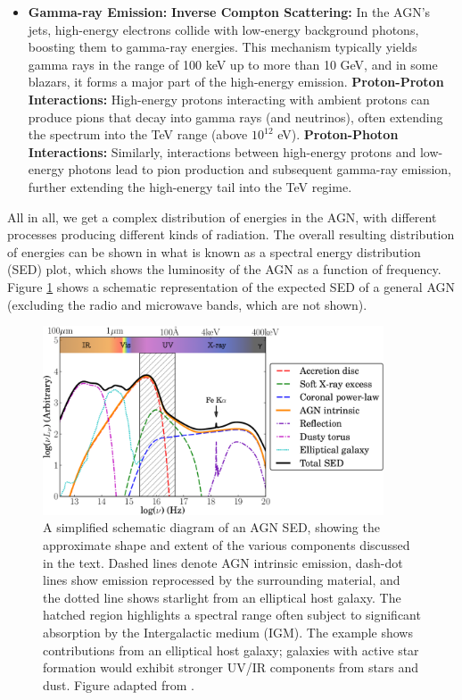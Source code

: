 \begin{itemize}
    \item \textbf{Gamma-ray Emission:}
    \subitem \textbf{Inverse Compton Scattering:} In the AGN's jets, high-energy electrons collide with low-energy background photons, boosting them to gamma-ray energies. This mechanism typically yields gamma rays in the range of 100 keV up to more than 10 GeV, and in some blazars, it forms a major part of the high-energy emission.
    \subitem \textbf{Proton-Proton Interactions:} High-energy protons interacting with ambient protons can produce pions that decay into gamma rays (and neutrinos), often extending the spectrum into the TeV range (above $10^{12}$ eV). 
    \subitem \textbf{Proton-Photon Interactions:} Similarly, interactions between high-energy protons and low-energy photons lead to pion production and subsequent gamma-ray emission, further extending the high-energy tail into the TeV regime.
\end{itemize}

All in all, we get a complex distribution of energies in the AGN, with different processes producing different kinds of radiation. The overall resulting distribution of energies can be shown in what is known as a spectral energy distribution (SED) plot, which shows the luminosity of the AGN as a function of frequency. Figure \ref{fig:AGN_SED} shows a schematic representation of the expected SED of a general AGN (excluding the radio and microwave bands, which are not shown).

\begin{figure}[H]
    \centering
    \includegraphics[width=0.9\textwidth]{Figures/AGN SED.png}
    \caption{A simplified schematic diagram of an AGN SED, showing the approximate shape and extent of the various components discussed in the text. Dashed lines denote AGN intrinsic emission, dash-dot lines show emission reprocessed by the surrounding material, and the dotted line shows starlight from an elliptical host galaxy. The hatched region highlights a spectral range often subject to significant absorption by the Intergalactic medium (IGM). The example shows contributions from an elliptical host galaxy; galaxies with active star formation would exhibit stronger UV/IR components from stars and dust. Figure adapted from \citet{QuasarSEDCollinson_2016}.}
    \label{fig:AGN_SED}
\end{figure}

